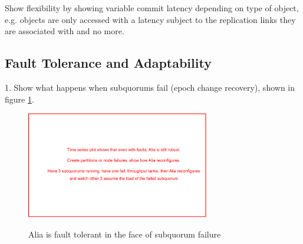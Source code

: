 \documentclass[sigplan,screen,review,anonymous,nonacm]{acmart}
\begin{document}

Show flexibility by showing variable commit latency depending on type of object, e.g. 
objects are only accessed with a latency subject to the replication links they are 
associated with and no more. 


\subsection{Fault Tolerance and Adaptability}

1. Show what happens when subquorums fail (epoch change recovery),
shown in figure \ref{fig:fault-tolerance}.

\begin{figure}
\caption{Alia is fault tolerant in the face of subquorum failure}
\centering
\includegraphics[width=8cm]{fault-tolerence-placeholder.png}
\label{fig:fault-tolerance}
\end{figure}
\end{document}

